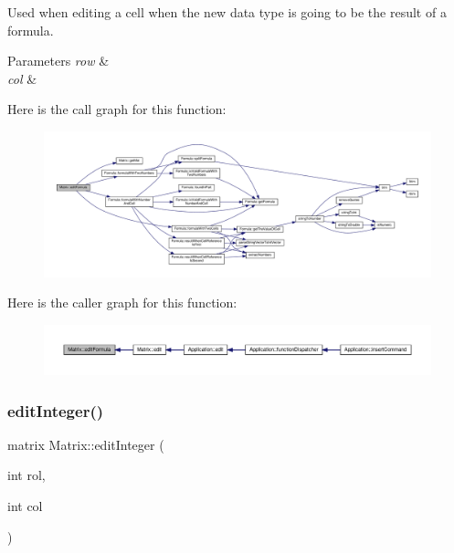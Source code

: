 Used when editing a cell when the new data type is going to be the result of a formula. 
\begin{DoxyParams}{Parameters}
{\em row} & \\
\hline
{\em col} & \\
\hline
\end{DoxyParams}
Here is the call graph for this function\+:\nopagebreak
\begin{figure}[H]
\begin{center}
\leavevmode
\includegraphics[width=350pt]{class_matrix_af3d26e46fcec1a98380b1af04f008f22_cgraph}
\end{center}
\end{figure}
Here is the caller graph for this function\+:\nopagebreak
\begin{figure}[H]
\begin{center}
\leavevmode
\includegraphics[width=350pt]{class_matrix_af3d26e46fcec1a98380b1af04f008f22_icgraph}
\end{center}
\end{figure}
\mbox{\label{class_matrix_a91c66e2961a16adf56b8d58b916d2d46}} 
\subsubsection{\texorpdfstring{edit\+Integer()}{editInteger()}}
{\footnotesize\ttfamily matrix Matrix\+::edit\+Integer (\begin{DoxyParamCaption}\item[{int}]{rol,  }\item[{int}]{col }\end{DoxyParamCaption})\hspace{0.3cm}{\ttfamily [private]}}

